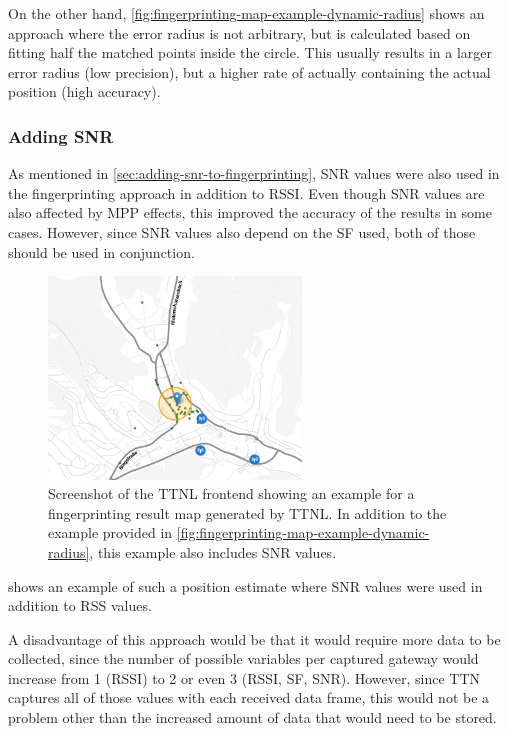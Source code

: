 On the other hand, \cref{fig:fingerprinting-map-example-dynamic-radius} shows an approach where the error radius is not arbitrary, but is calculated based on fitting half the matched points inside the circle.
This usually results in a larger error radius (low precision), but a higher rate of actually containing the actual position (high accuracy).

\subsubsection{Adding \acf{SNR}}


As mentioned in \cref{sec:adding-snr-to-fingerprinting}, \ac{SNR} values were also used in the fingerprinting approach in addition to \ac{RSSI}.
Even though \ac{SNR} values are also affected by \ac{MPP} effects, this improved the accuracy of the results in some cases.
However, since \ac{SNR} values also depend on the \ac{SF} used, both of those should be used in conjunction.

\begin{figure}[htbp]
    \centering
    \includegraphics[width=0.6\textwidth]{pictures/ttn-locator/frontend/fingerprinting/fingerprinting_map_example_with_snr.png}
    \caption{
        Screenshot of the \ac{TTNL} frontend showing an example for a fingerprinting result map generated by \ac{TTNL}.
        In addition to the example provided in \cref{fig:fingerprinting-map-example-dynamic-radius}, this example also includes \ac{SNR} values.
    }\label{fig:fingerprinting-map-example-with-snr}
\end{figure}

 shows an example of such a position estimate where \ac{SNR} values were used in addition to \ac{RSS} values.

A disadvantage of this approach would be that it would require more data to be collected, since the number of possible variables per captured gateway would increase from 1 (\ac{RSSI}) to 2 or even 3 (\ac{RSSI}, \ac{SF}, \ac{SNR}).
However, since \ac{TTN} captures all of those values with each received data frame, this would not be a problem other than the increased amount of data that would need to be stored.

